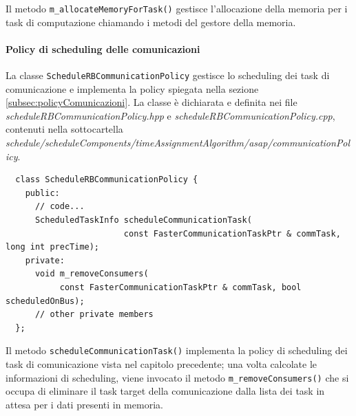 Il metodo \verb+m_allocateMemoryForTask()+ gestisce l'allocazione della memoria 
per i task di computazione chiamando i metodi del gestore della memoria.

\paragraph{Policy di scheduling delle comunicazioni}
La classe \verb+ScheduleRBCommunicationPolicy+ gestisce lo scheduling dei task 
di comunicazione e implementa la policy spiegata nella sezione 
\ref{subsec:policyComunicazioni}. La classe è dichiarata e definita nei file 
\emph{scheduleRBCommunicationPolicy.hpp} e  \emph{scheduleRBCommunicationPolicy.cpp},
contenuti nella sottocartella  \emph{schedule/scheduleComponents/timeAssignmentAlgorithm/asap/communicationPolicy}.
\newline
\begin{verbatim}
  class ScheduleRBCommunicationPolicy {
    public:
      // code...
      ScheduledTaskInfo scheduleCommunicationTask(
                        const FasterCommunicationTaskPtr & commTask, long int precTime);
    private:
      void m_removeConsumers(
           const FasterCommunicationTaskPtr & commTask, bool scheduledOnBus);
      // other private members
  };
\end{verbatim}

Il metodo \verb+scheduleCommunicationTask()+ implementa la policy di scheduling dei
task di comunicazione vista nel capitolo precedente; una volta calcolate le informazioni
di scheduling, viene invocato il metodo \verb+m_removeConsumers()+ che si occupa di
eliminare il task target della comunicazione dalla lista dei task in attesa per
i dati presenti in memoria.

